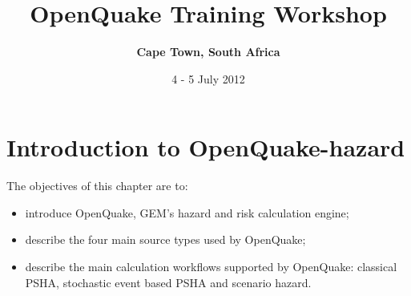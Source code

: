 \documentclass[11pt,a4paper,headings=small,dvips]{scrbook}
\newenvironment{myfancybox}{%
  \def\FrameCommand{\fboxsep=\FrameSep \fcolorbox{blue01}{honeydew}}%
  \color{black}\MakeFramed {\FrameRestore}}%
 {\endMakeFramed}
\begin{document}
\setcounter{page}{1}

\begin{titlepage}
	\title{ \textcolor{blue01}{\textsf{\bfseries\Huge 
        OpenQuake Training Workshop\\
        }}}
	\subtitle{ \textcolor{blue01}{\textsf{\bfseries\LARGE
        Cape Town, South Africa}}}
	\date{4 - 5 July 2012}
 
	\publishers{GEM Foundation, Pavia}
\end{titlepage}

\pagestyle{scrheadings}
\maketitle
\renewcommand*\thesection{\arabic{section}}
\renewcommand*\thefigure{\thesection.\arabic{figure}}
\clearpage
\tableofcontents
\cleardoublepage
\chapter{Introduction to OpenQuake-hazard}
\begin{myfancybox}
The objectives of this chapter are to:
\begin{itemize}
    \item introduce OpenQuake, GEM's hazard and risk calculation engine;
    \item describe the four main source types used by OpenQuake;
    \item describe the main calculation workflows supported by OpenQuake: 
        classical PSHA, stochastic event based PSHA and scenario hazard.
\end{itemize}
\end{myfancybox}
    
\end{document}
